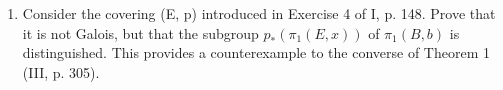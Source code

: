 \exercisegroup

\begin{enumerate}
\def\labelenumi{\arabic{enumi})}
\tightlist
\item
  Consider the covering (E, p) introduced in Exercise 4 of I, p. 148. Prove that it is not Galois, but that the subgroup \(p_{*}(\pi_{1}(E, x))\) of \(\pi_{1}(B, b)\) is distinguished. This provides a counterexample to the converse of Theorem 1 (III, p. 305).
\end{enumerate}

